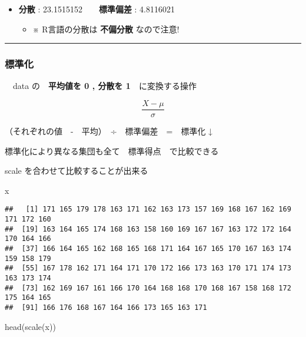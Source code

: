 \documentclass[
]{article}
\newenvironment{Shaded}{\begin{snugshade}}{\end{snugshade}}
\newcommand{\FunctionTok}[1]{\textcolor[rgb]{0.00,0.00,0.00}{#1}}
\newcommand{\NormalTok}[1]{#1}
\providecommand{\tightlist}{%
  \setlength{\itemsep}{0pt}\setlength{\parskip}{0pt}}
\begin{document}
\begin{itemize}
\item
  \textbf{分散} : 23.1515152　\textbar{}　\textbf{標準偏差} : 4.8116021

  \begin{itemize}
  \tightlist
  \item
    ※ R言語の分散は \textbf{不偏分散} なので注意!
  \end{itemize}
\end{itemize}

\begin{center}\rule{0.5\linewidth}{0.5pt}\end{center}

\hypertarget{ux6a19ux6e96ux5316}{%
\subsubsection{標準化}\label{ux6a19ux6e96ux5316}}

　data の　\textbf{平均値を 0 , 分散を 1}　に変換する操作

\[
\frac{X - \mu}{\sigma}
\]

（それぞれの値　-　平均）　÷　標準偏差　=　標準化 ↓

標準化により異なる集団も全て　標準得点　で比較できる

\textbar\textbar{} scale を合わせて比較することが出来る

\begin{Shaded}
\begin{Highlighting}[]
\NormalTok{x}
\end{Highlighting}
\end{Shaded}

\begin{verbatim}
##   [1] 171 165 179 178 163 171 162 163 173 157 169 168 167 162 169 171 172 160
##  [19] 163 164 165 174 168 163 158 160 169 167 167 163 172 172 164 170 164 166
##  [37] 166 164 165 162 168 165 168 171 164 167 165 170 167 163 174 159 158 179
##  [55] 167 178 162 171 164 171 170 172 166 173 163 170 171 174 173 163 173 174
##  [73] 162 169 167 161 166 170 164 168 168 170 168 167 158 168 172 175 164 165
##  [91] 166 176 168 167 164 166 173 165 163 171
\end{verbatim}

\begin{Shaded}
\begin{Highlighting}[]
\FunctionTok{head}\NormalTok{(}\FunctionTok{scale}\NormalTok{(x))}
\end{Highlighting}
\end{Shaded}
\end{document}
